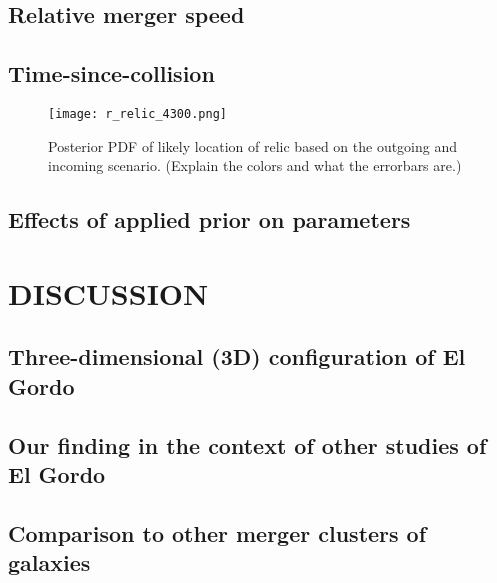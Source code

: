 \subsection{Relative merger speed}


\subsection{Time-since-collision}  


\begin{figure} 
	\label{fig: positionprior}
	\texttt{[image: r\_relic\_4300.png]}
	\caption{Posterior PDF of likely location of relic based on the
    outgoing and incoming scenario. (Explain the colors and what the
	errorbars are.)}
\end{figure}

\subsection{Effects of applied prior on parameters}





\section{DISCUSSION}

\subsection{Three-dimensional (3D) configuration of El Gordo}


\subsection{Our finding in the context of other studies of El Gordo}


\subsection{Comparison to other merger clusters of galaxies}



